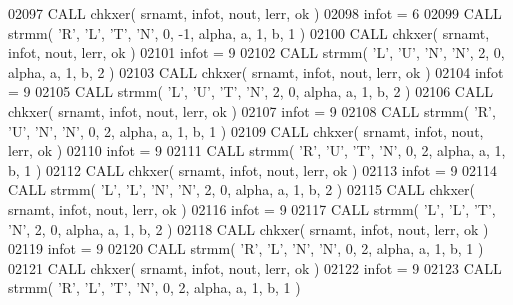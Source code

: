 \begin{DoxyCode}
02097       \textcolor{keyword}{CALL }chkxer( srnamt, infot, nout, lerr, ok )
02098       infot = 6
02099       \textcolor{keyword}{CALL }strmm( \textcolor{stringliteral}{'R'}, \textcolor{stringliteral}{'L'}, \textcolor{stringliteral}{'T'}, \textcolor{stringliteral}{'N'}, 0, -1, alpha, a, 1, b, 1 )
02100       \textcolor{keyword}{CALL }chkxer( srnamt, infot, nout, lerr, ok )
02101       infot = 9
02102       \textcolor{keyword}{CALL }strmm( \textcolor{stringliteral}{'L'}, \textcolor{stringliteral}{'U'}, \textcolor{stringliteral}{'N'}, \textcolor{stringliteral}{'N'}, 2, 0, alpha, a, 1, b, 2 )
02103       \textcolor{keyword}{CALL }chkxer( srnamt, infot, nout, lerr, ok )
02104       infot = 9
02105       \textcolor{keyword}{CALL }strmm( \textcolor{stringliteral}{'L'}, \textcolor{stringliteral}{'U'}, \textcolor{stringliteral}{'T'}, \textcolor{stringliteral}{'N'}, 2, 0, alpha, a, 1, b, 2 )
02106       \textcolor{keyword}{CALL }chkxer( srnamt, infot, nout, lerr, ok )
02107       infot = 9
02108       \textcolor{keyword}{CALL }strmm( \textcolor{stringliteral}{'R'}, \textcolor{stringliteral}{'U'}, \textcolor{stringliteral}{'N'}, \textcolor{stringliteral}{'N'}, 0, 2, alpha, a, 1, b, 1 )
02109       \textcolor{keyword}{CALL }chkxer( srnamt, infot, nout, lerr, ok )
02110       infot = 9
02111       \textcolor{keyword}{CALL }strmm( \textcolor{stringliteral}{'R'}, \textcolor{stringliteral}{'U'}, \textcolor{stringliteral}{'T'}, \textcolor{stringliteral}{'N'}, 0, 2, alpha, a, 1, b, 1 )
02112       \textcolor{keyword}{CALL }chkxer( srnamt, infot, nout, lerr, ok )
02113       infot = 9
02114       \textcolor{keyword}{CALL }strmm( \textcolor{stringliteral}{'L'}, \textcolor{stringliteral}{'L'}, \textcolor{stringliteral}{'N'}, \textcolor{stringliteral}{'N'}, 2, 0, alpha, a, 1, b, 2 )
02115       \textcolor{keyword}{CALL }chkxer( srnamt, infot, nout, lerr, ok )
02116       infot = 9
02117       \textcolor{keyword}{CALL }strmm( \textcolor{stringliteral}{'L'}, \textcolor{stringliteral}{'L'}, \textcolor{stringliteral}{'T'}, \textcolor{stringliteral}{'N'}, 2, 0, alpha, a, 1, b, 2 )
02118       \textcolor{keyword}{CALL }chkxer( srnamt, infot, nout, lerr, ok )
02119       infot = 9
02120       \textcolor{keyword}{CALL }strmm( \textcolor{stringliteral}{'R'}, \textcolor{stringliteral}{'L'}, \textcolor{stringliteral}{'N'}, \textcolor{stringliteral}{'N'}, 0, 2, alpha, a, 1, b, 1 )
02121       \textcolor{keyword}{CALL }chkxer( srnamt, infot, nout, lerr, ok )
02122       infot = 9
02123       \textcolor{keyword}{CALL }strmm( \textcolor{stringliteral}{'R'}, \textcolor{stringliteral}{'L'}, \textcolor{stringliteral}{'T'}, \textcolor{stringliteral}{'N'}, 0, 2, alpha, a, 1, b, 1 )

\end{DoxyCode}
